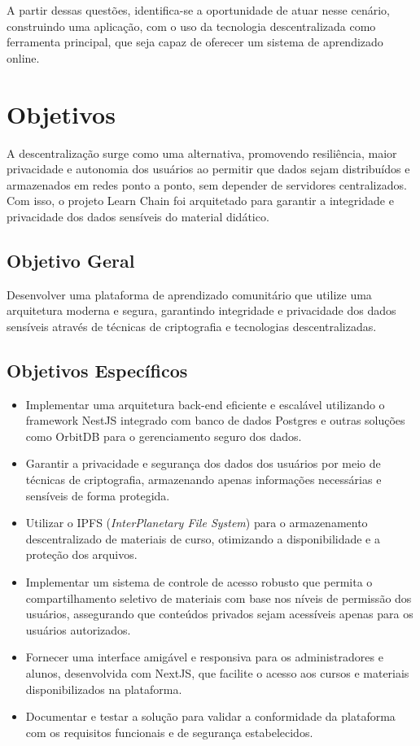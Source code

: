A partir dessas questões, identifica-se a oportunidade de atuar nesse cenário, construindo uma aplicação, com o uso da tecnologia descentralizada como ferramenta principal, que seja capaz de oferecer um sistema de aprendizado online.

\section{Objetivos}

A descentralização surge como uma alternativa, promovendo resiliência, maior privacidade e autonomia dos usuários ao permitir que dados sejam distribuídos e armazenados em redes ponto a ponto, sem depender de servidores centralizados. Com isso, o projeto Learn Chain foi arquitetado para garantir a integridade e privacidade dos dados sensíveis do material didático. 

\subsection{Objetivo Geral}

Desenvolver uma plataforma de aprendizado comunitário que utilize uma arquitetura moderna e segura, garantindo integridade e privacidade dos dados sensíveis através de técnicas de criptografia e tecnologias descentralizadas.

\subsection{Objetivos Específicos}

\begin{itemize}
    \item Implementar uma arquitetura back-end eficiente e escalável utilizando o framework NestJS integrado com banco de dados Postgres e outras soluções como OrbitDB para o gerenciamento seguro dos dados.
    \item Garantir a privacidade e segurança dos dados dos usuários por meio de técnicas de criptografia, armazenando apenas informações necessárias e sensíveis de forma protegida.
    \item Utilizar o IPFS (\textit{InterPlanetary File System}) para o armazenamento descentralizado de materiais de curso, otimizando a disponibilidade e a proteção dos arquivos.
    \item Implementar um sistema de controle de acesso robusto que permita o compartilhamento seletivo de materiais com base nos níveis de permissão dos usuários, assegurando que conteúdos privados sejam acessíveis apenas para os usuários autorizados.
    \item Fornecer uma interface amigável e responsiva para os administradores e alunos, desenvolvida com NextJS, que facilite o acesso aos cursos e materiais disponibilizados na plataforma.
    \item Documentar e testar a solução para validar a conformidade da plataforma com os requisitos funcionais e de segurança estabelecidos.
\end{itemize}

